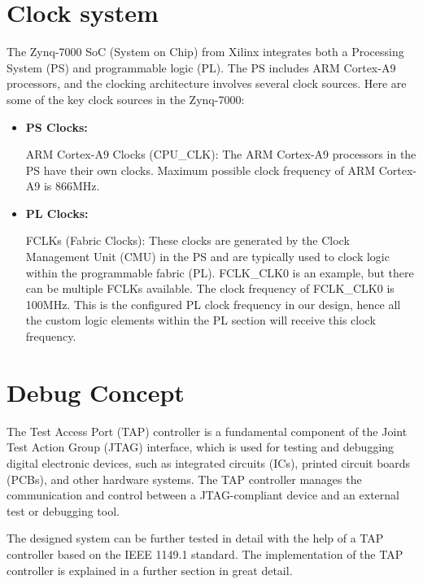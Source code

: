 \section{Clock system} 

The Zynq-7000 SoC (System on Chip) from Xilinx integrates both a Processing System (PS) and programmable logic (PL). The PS includes ARM Cortex-A9 processors, and the clocking architecture involves several clock sources. Here are some of the key clock sources in the Zynq-7000:

\begin{itemize} \item \textbf{PS Clocks:}


     ARM Cortex-A9 Clocks (CPU\_CLK): The ARM Cortex-A9 processors in the PS have their own clocks. Maximum possible clock frequency of ARM Cortex-A9 is 866MHz.
\end{itemize}


 \begin{itemize}
     \item \textbf{PL Clocks:}
     

     FCLKs (Fabric Clocks): These clocks are generated by the Clock Management Unit (CMU) in the PS and are typically used to clock logic within the programmable fabric (PL). FCLK\_CLK0 is an example, but there can be multiple FCLKs available. The clock frequency of  FCLK\_CLK0 is 100MHz. This is the configured PL clock frequency in our design, hence all the custom logic elements within the PL section will receive this clock frequency.
 \end{itemize}
\section{Debug Concept}

The Test Access Port (TAP) controller is a fundamental component of the Joint Test Action Group (JTAG) interface, which is used for testing and debugging digital electronic devices, such as integrated circuits (ICs), printed circuit boards (PCBs), and other hardware systems. The TAP controller manages the communication and control between a JTAG-compliant device and an external test or debugging tool.


\vspace{2mm}
The designed system can be further tested in detail with the help of a TAP controller based on the IEEE 1149.1 standard. The implementation of the TAP controller is explained in a further section in great detail.



